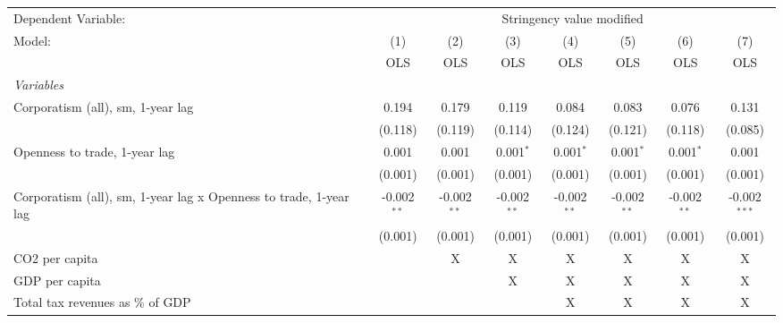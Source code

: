
\begingroup
\centering
\begin{tabular}{lccccccc}
   \toprule
   Dependent Variable: & \multicolumn{7}{c}{Stringency value modified}\\
   Model:                                                            & (1)           & (2)           & (3)           & (4)           & (5)           & (6)           & (7)\\  
                                                                     &  OLS          & OLS           & OLS           & OLS           & OLS           & OLS           & OLS\\  
   \midrule
   \emph{Variables}\\
   Corporatism (all), sm, 1-year lag                                 & 0.194         & 0.179         & 0.119         & 0.084         & 0.083         & 0.076         & 0.131\\   
                                                                     & (0.118)       & (0.119)       & (0.114)       & (0.124)       & (0.121)       & (0.118)       & (0.085)\\   
   Openness to trade, 1-year lag                                     & 0.001         & 0.001         & 0.001$^{*}$   & 0.001$^{*}$   & 0.001$^{*}$   & 0.001$^{*}$   & 0.001\\   
                                                                     & (0.001)       & (0.001)       & (0.001)       & (0.001)       & (0.001)       & (0.001)       & (0.001)\\   
   Corporatism (all), sm, 1-year lag x Openness to trade, 1-year lag & -0.002$^{**}$ & -0.002$^{**}$ & -0.002$^{**}$ & -0.002$^{**}$ & -0.002$^{**}$ & -0.002$^{**}$ & -0.002$^{***}$\\   
                                                                     & (0.001)       & (0.001)       & (0.001)       & (0.001)       & (0.001)       & (0.001)       & (0.001)\\   
   CO2 per capita                                                    &               & X             & X             & X             & X             & X             & X\\  
   GDP per capita                                                    &               &               & X             & X             & X             & X             & X\\  
   Total tax revenues as \% of GDP                                   &               &               &               & X             & X             & X             & X\\  

\end{tabular}
